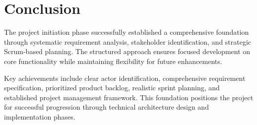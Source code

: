 \section{Conclusion}

The project initiation phase successfully established a comprehensive foundation through systematic requirement analysis, stakeholder identification, and strategic Scrum-based planning. The structured approach ensures focused development on core functionality while maintaining flexibility for future enhancements.

Key achievements include clear actor identification, comprehensive requirement specification, prioritized product backlog, realistic sprint planning, and established project management framework. This foundation positions the project for successful progression through technical architecture design and implementation phases.